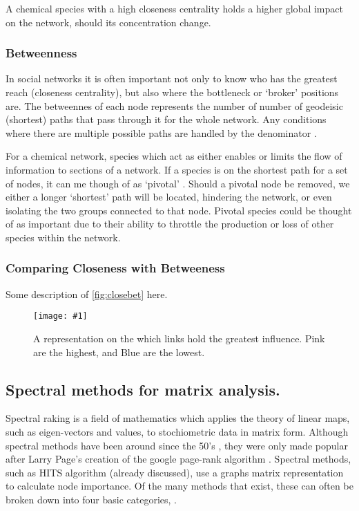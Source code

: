 \documentclass[twoside,reqno]{article}
\newcommand{\qfig}[4]{\begin{figure}[H]\centering\texttt{[image: \#1]}\caption{#3}\label{#2}\end{figure}\newpage}
\begin{document}
A chemical species with a high closeness centrality holds a higher global impact on the network, should its concentration change.



\subsubsection{Betweenness}
In social networks it is often important not only to know who has the greatest reach (closeness centrality), but also where the bottleneck or `broker' positions are.
The betweennes of each node represents the number of number of geodeisic (shortest) paths that pass through it for the whole network. Any conditions where there are multiple possible paths are handled by the denominator \cite{betweenness,between,betweenfast,examples_centrality}.

For a chemical network, species which act as either enables or limits the flow of information to sections of a network. If a species is on the shortest path for a set of nodes, it can me though of as `pivotal' \cite{neoj4}. Should a pivotal node be removed, we either a longer `shortest' path will be located, hindering the network, or even isolating the two groups connected to that node. Pivotal species could be thought of as important due to their ability to throttle the production or loss of other species within the network.

\subsubsection{Comparing Closeness with Betweeness}
 Some description of \autoref{fig:closebet} here.


\qfig{newfigs/ch2_between_close.pdf}{fig:closebet}{A representation on the which links hold the greatest influence. Pink are the highest, and Blue are the lowest.}{\textwidth}


\subsection{Spectral methods for matrix analysis.}
Spectral raking is a field of mathematics which applies the theory of linear maps, such as eigen-vectors and values, to stochiometric data in matrix form. Although spectral methods have been around since the 50's \cite{seeley}, they were only made popular after Larry Page's creation of the google page-rank algorithm \cite{google}. Spectral methods, such as HITS algorithm (already discussed), use a graphs matrix representation to calculate node importance. Of the many methods that exist, these can often be broken down into four basic categories, \cite{spectral}.
\end{document}
